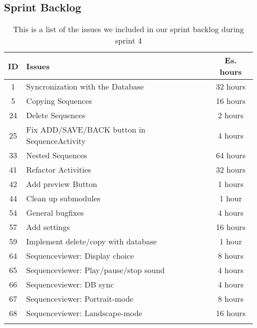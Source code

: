 \subsection{Sprint Backlog}\label{subsec:spr4_sprblog}
\begin{longtable} { | c | p{12cm} | c | } 
\hline
	ID 	&	Issues	&	Es. hours  \\\hline
	1	& 	Syncronization with the Database		&	32 hours  \\\hline
	5	& 	Copying Sequences		&	16 hours  \\\hline
	24	& 	Delete Sequences		&	2 hours  \\\hline
	25	& 	Fix ADD/SAVE/BACK button in SequenceActivity		&	4 hours  \\\hline
	33	& 	Nested Sequences		&	64 hours  \\\hline
	41	& 	Refactor Activities		&	32 hours  \\\hline
	42	&	Add preview Button		&	1 hours	  \\\hline
	44	&	Clean up submodules &	1 hour	\\\hline
	54	&	General bugfixes	&	4 hours \\\hline
	57  &	Add settings			&	16 hours	\\\hline	
	59  &	Implement delete/copy with database	&	1 hour \\\hline
	64	& 	Sequenceviewer: Display choice		&	8 hours  \\\hline
	65	& 	Sequenceviewer: Play/pause/stop sound		&	4 hours  \\\hline
	66	& 	Sequenceviewer: DB sync		&	4 hours  \\\hline
	67	& 	Sequenceviewer: Portrait-mode		&	8 hours  \\\hline
	68	& 	Sequenceviewer: Landscape-mode	&	16 hours  \\\hline
\caption{This is a list of the issues we included in our sprint backlog during sprint 4}
\label{tab:spr4_sprintblog}
\end{longtable}